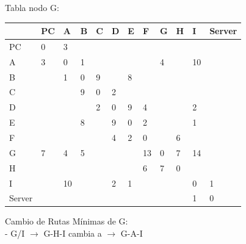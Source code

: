 \documentclass[a4paper]{article}
\begin{document}
\begin{table}[h]
Tabla nodo G:\\
\begin{tabular}{|l|l|l|l|l|l|l|l|l|l|l|l|}
\hline
       & PC & A  & B & C & D & E & F  & G & H & I  & Server \\ \hline
PC     & 0  & 3  &   &   &   &   &    &   &   &    &        \\ \hline
A      & 3  & 0  & 1 &   &   &   &    & 4 &   & 10 &        \\ \hline
B      &    & 1  & 0 & 9 &   & 8 &    &   &   &    &        \\ \hline
C      &    &    & 9 & 0 & 2 &   &    &   &   &    &        \\ \hline
D      &    &    &   & 2 & 0 & 9 & 4  &   &   & 2  &        \\ \hline
E      &    &    & 8 &   & 9 & 0 & 2  &   &   & 1  &        \\ \hline
F      &    &    &   &   & 4 & 2 & 0  &   & 6 &    &        \\ \hline
G      & 7  & 4  & 5 &   &   &   & 13 & 0 & 7 & 14 &        \\ \hline
H      &    &    &   &   &   &   & 6  & 7 & 0 &    &        \\ \hline
I      &    & 10 &   &   & 2 & 1 &    &   &   & 0  & 1      \\ \hline
Server &    &    &   &   &   &   &    &   &   & 1  & 0      \\ \hline
\end{tabular}

Cambio de Rutas Mínimas de G:\\
-	G/I  $\rightarrow$  G-H-I  cambia a  $\rightarrow$  G-A-I

\end{table}

\clearpage
\end{document}
